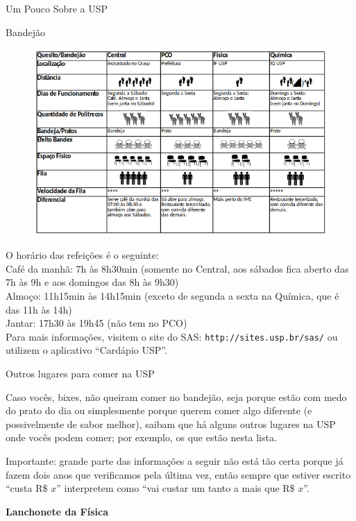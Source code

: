 \begin{secao}{Um Pouco Sobre a USP}
\begin{subsecao}{Bandejão}
\begin{figure}[!htbp]
\begin{center}
	\includegraphics{img/src/bandex.png}
\end{center}
\end{figure}
O horário das refeições é o seguinte:\\
Café da manhã: 7h às 8h30min (somente no Central, aos sábados fica aberto das
7h às 9h e aos domingos das 8h às 9h30)\\
Almoço: 11h15min às 14h15min (exceto de segunda a sexta na Química, que é das 11h às 14h)\\
Jantar: 17h30 às 19h45 (não tem no PCO)\\

Para mais informações, visitem o site do SAS: {\tt http://sites.usp.br/sas/} ou
utilizem o aplicativo ``Cardápio USP''.

\end{subsecao}

\begin{subsecao}{Outros lugares para comer na USP}

Caso vocês, bixes, não queiram comer no bandejão, seja porque estão com medo do
prato do dia ou simplesmente porque querem comer algo diferente (e
possivelmente de sabor melhor), saibam que há alguns outros lugares na USP onde
vocês podem comer; por exemplo, os que estão nesta lista.

Importante: grande parte das informações a seguir não está tão certa porque já
fazem dois anos que verificamos pela última vez, então sempre que estiver
escrito ``custa R\$ $x$'' interpretem como ``vai custar um tanto a mais que R\$ $x$''.

{\bf Lanchonete da Física}


\end{subsecao}
\end{secao}
